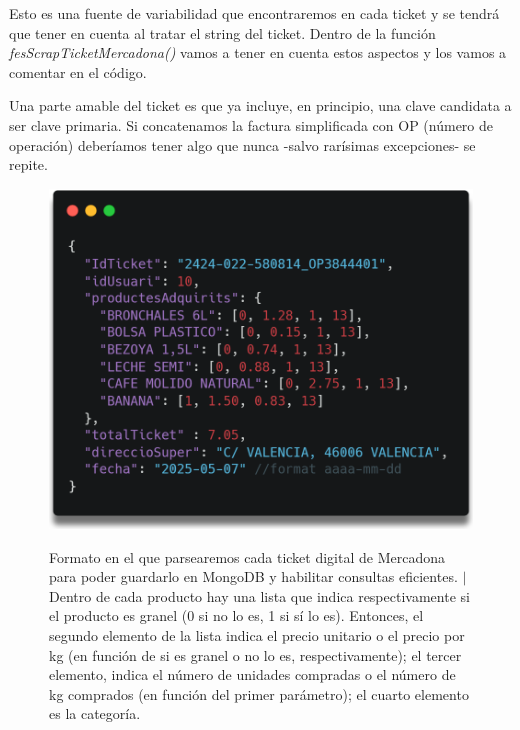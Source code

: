 \documentclass[a4paper,12pt]{report}
\begin{document}
		Esto es una fuente de variabilidad que encontraremos en cada ticket y se tendrá que tener en cuenta al tratar el string del ticket. Dentro de la función \textit{fesScrapTicketMercadona()} vamos a tener en cuenta estos aspectos y los vamos a comentar en el código.
		
		Una parte amable del ticket es que ya incluye, en principio, una clave candidata a ser clave primaria. Si concatenamos la factura simplificada con OP (número de operación) deberíamos tener algo que nunca -salvo rarísimas excepciones- se repite.
		
		
		
		
		\FloatBarrier
		\setlength{\belowcaptionskip}{3pt}
		\begin{figure}[H]
			\centering
			\caption{Formato en el que parsearemos cada ticket digital de Mercadona para poder guardarlo en MongoDB y habilitar consultas eficientes. $|$Dentro de cada producto hay una lista que indica respectivamente si el producto es granel (0 si no lo es, 1 si sí lo es). Entonces, el segundo elemento de la lista indica el precio unitario o el precio por kg (en función de si es granel o no lo es, respectivamente); el tercer elemento, indica el número de unidades compradas o el número de kg comprados (en función del primer parámetro); el cuarto elemento es la categoría.}
			\includegraphics[width=.8\linewidth]{img/ticketJsonEstructuratMostra}
			\label{fig:ticketJsonEstructuratMostra}
		\end{figure}
		\FloatBarrier
\end{document}
